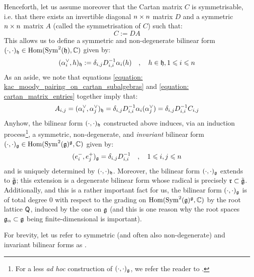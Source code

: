 Henceforth, let us assume moreover that the Cartan matrix $C$ is symmetrisable, i.e. that there exists an invertible diagonal $n \x n$ matrix $D$ and a symmetric $n \x n$ matrix $A$ (called the symmetrisation of $C$) such that:
    \begin{equation} \label{equation: symmetrising_cartan_matrices}
        C := DA
    \end{equation}
This allows us to define a symmetric and non-degenerate bilinear form $(\cdot, \cdot)_{\mathfrak{h}} \in \operatorname{Hom}( \operatorname{Sym}^2(\mathfrak{h}), \mathbb{C} )$ given by:
    \begin{equation} \label{equation: kac_moody_pairing_on_cartan_subalgebras}
        ( \alpha_i^{\vee}, h )_{\mathfrak{h}} := \delta_{i, j} D_{i, i}^{-1} \alpha_i(h) \quad, \quad h \in \mathfrak{h}, 1 \leqslant i \leqslant n
    \end{equation}
As an aside, we note that equations \eqref{equation: kac_moody_pairing_on_cartan_subalgebras} and \eqref{equation: cartan_matrix_entries} together imply that:
    $$A_{i, j} = (\alpha_i^{\vee}, \alpha_j^{\vee})_{\mathfrak{h}} = \delta_{i, j} D_{i, i}^{-1} \alpha_i( \alpha_j^{\vee} ) = \delta_{i, j} D_{i, i}^{-1} C_{i, j}$$
Anyhow, the bilinear form $(\cdot, \cdot)_{\mathfrak{h}}$ constructed above induces, via an induction process\footnote{For a less \textit{ad hoc} construction of $(\cdot, \cdot)_{\mathfrak{g}}$, we refer the reader to \cite{neher_pianzola_prelat_sepp_invariant_bilinear_forms_via_fppf_descent}.}, a symmetric, non-degenerate, and \textit{invariant} bilinear form $(\cdot, \cdot)_{\mathfrak{g}} \in \operatorname{Hom}( \operatorname{Sym}^2(\mathfrak{g})^{\mathfrak{g}}, \mathbb{C} )$ given by:
    \begin{equation} \label{equation: kac_moody_pairing}
        ( e_i^-, e_j^+ )_{\mathfrak{g}} = \delta_{i, j} D_{i, i}^{-1} \quad, \quad 1 \leqslant i, j \leqslant n
    \end{equation}
and is uniquely determined by $(\cdot, \cdot)_{\mathfrak{h}}$. Moreover, the bilinear form $(\cdot, \cdot)_{\mathfrak{g}}$ extends to $\tilde{\mathfrak{g}}$; this extension is a degenerate bilinear form whose radical is precisely $\mathfrak{r} \subset \tilde{\mathfrak{g}}$. Additionally, and this is a rather important fact for us, the bilinear form $(\cdot, \cdot)_{\mathfrak{g}}$ is of total degree $0$ with respect to the grading on $\operatorname{Hom}( \operatorname{Sym}^2(\mathfrak{g})^{\mathfrak{g}}, \mathbb{C} )$ by the root lattice $\mathsf{Q}$, induced by the one on $\mathfrak{g}$ (and this is one reason why the root spaces $\mathfrak{g}_{\alpha} \subset \mathfrak{g}$ being finite-dimensional is important).
\begin{convention}
    For brevity, let us refer to symmetric (and often also non-degenerate) and invariant bilinear forms as .
\end{convention}